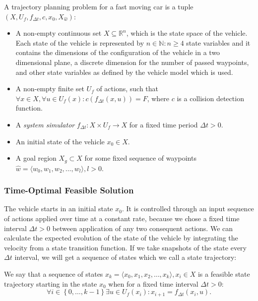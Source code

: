 \begin{defn}

	A trajectory planning problem for a fast moving car is a tuple $\left(X, U_f, f_{\Delta t}, c, x_0, X_{\hat{w}}\right)$:

	\begin{itemize}
		\item A non-empty continuous set $X\subseteq\mathbb{R}^n$, which is the state space of the vehicle. Each state of the vehicle is represented by $n\in\mathbb{N}:n\geq4$ state variables and it contains the dimensions of the configuration of the vehicle in a two dimensional plane, a discrete dimension for the number of passed waypoints, and other state variables as defined by the vehicle model which is used.

		\item A non-empty finite set $U_f$ of actions, such that $\forall x\in X, \forall u\in U_f(x): c(f_{\Delta t}(x, u)) = F$, where $c$ is a collision detection function.

		\item A \textit{system simulator} $f_{\Delta t}:X\times U_f \rightarrow X$ for a fixed time period $\Delta t>0$.
		
		\item An initial state of the vehicle $x_0 \in X$.

		\item A goal region $X_g\subset X$ for some fixed sequence of waypoints $\hat{w}=\langle w_0, w_1, w_2,\ldots, w_l \rangle, l>0$.
	\end{itemize}
\end{defn}

\subsubsection{Time-Optimal Feasible Solution}

The vehicle starts in an initial state $x_0$. It is controlled through an input sequence of actions applied over time at a constant rate, because we chose a fixed time interval $\Delta t>0$ between application of any two consequent actions. We can calculate the expected evolution of the state of the vehicle by integrating the velocity from a state transition function. If we take snapshots of the state every $\Delta t$ interval, we will get a sequence of states which we call a state trajectory:

\begin{defn}
	We say that a sequence of states $\hat{x_k}=\langle x_0,x_1,x_2,…,x_k \rangle ,x_i\in X$ is a feasible state trajectory starting in the state $x_0$ when for a fixed time interval $\Delta t>0$:
	\[
	\forall i \in \left\{ 0,\ldots,k-1\right\} \exists u\in U_f(x_i): x_{i+1}=f_{\Delta t} (x_i,u).
	\]
\end{defn}

